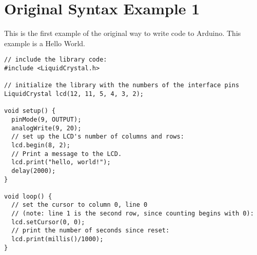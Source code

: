 \section{Original Syntax Example 1}
This is the first example of the original way to write code to Arduino. This example is a Hello World.
\begin{lstlisting}[caption=This is the first original Arduino example \cite{arduino_hello_world_example}, label=lst:first_syntax_example]
// include the library code:
#include <LiquidCrystal.h>

// initialize the library with the numbers of the interface pins
LiquidCrystal lcd(12, 11, 5, 4, 3, 2);

void setup() {
  pinMode(9, OUTPUT);
  analogWrite(9, 20);
  // set up the LCD's number of columns and rows: 
  lcd.begin(8, 2);
  // Print a message to the LCD.
  lcd.print("hello, world!");
  delay(2000);
}

void loop() {
  // set the cursor to column 0, line 0
  // (note: line 1 is the second row, since counting begins with 0):
  lcd.setCursor(0, 0);
  // print the number of seconds since reset:
  lcd.print(millis()/1000);
}
\end{lstlisting}
